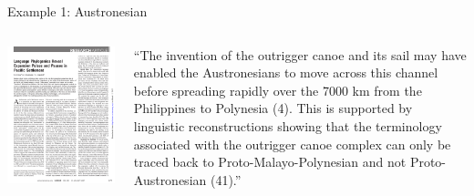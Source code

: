 \documentclass[9pt]{beamer}
\begin{document}
\begin{frame}{Example 1: Austronesian}
  \begin{columns}
    \begin{column}{0.5\textwidth}
      \footnotemark\includegraphics[width=\textwidth,page=2,trim={2cm 4cm 1cm 5cm},clip]{austronesian.pdf}
    \end{column}
    \begin{column}{0.5\textwidth}
      \footnotesize “The invention of the outrigger canoe and its
        sail may have enabled the Austronesians to move across this
        channel before spreading rapidly over the 7000 km from the
        Philippines to Polynesia (4). This is supported by linguistic
        reconstructions showing that the terminology associated with
        the outrigger canoe complex can only be traced back to
        Proto-Malayo-Polynesian and not Proto-Austronesian (41).”

\end{column}
\end{columns}
\end{frame}
\end{document}
